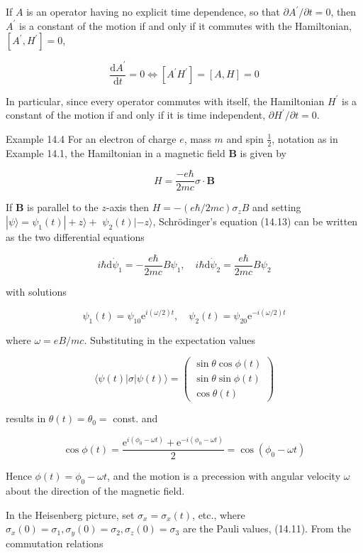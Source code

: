 \documentclass[10pt]{article}
\begin{document}
If $A$ is an operator having no explicit time dependence, so that $\partial A^{\prime} / \partial t=0$, then $A^{\prime}$ is a constant of the motion if and only if it commutes with the Hamiltonian, $\left[A^{\prime}, H^{\prime}\right]=0$,

$$
\frac{\mathrm{d} A^{\prime}}{\mathrm{d} t}=0 \Longleftrightarrow\left[A^{\prime} H^{\prime}\right]=[A, H]=0
$$

In particular, since every operator commutes with itself, the Hamiltonian $H^{\prime}$ is a constant of the motion if and only if it is time independent, $\partial H^{\prime} / \partial t=0$.

Example 14.4 For an electron of charge $e$, mass $m$ and spin $\frac{1}{2}$, notation as in Example 14.1, the Hamiltonian in a magnetic field $\mathbf{B}$ is given by

$$
H=\frac{-e \hbar}{2 m c} \sigma \cdot \mathbf{B}
$$

If $\mathbf{B}$ is parallel to the $z$-axis then $H=-(e \hbar / 2 m c) \sigma_{z} B$ and setting $|\psi\rangle=\psi_{1}(t)|+z\rangle+$ $\psi_{2}(t)|-z\rangle$, Schrödinger's equation (14.13) can be written as the two differential equations

$$
i \hbar \mathrm{d} \dot{\psi}_{1}=-\frac{e \hbar}{2 m c} B \psi_{1}, \quad i \hbar \mathrm{d} \dot{\psi}_{2}=\frac{e \hbar}{2 m c} B \psi_{2}
$$

with solutions

$$
\psi_{1}(t)=\psi_{10} \mathrm{e}^{i(\omega / 2) t}, \quad \psi_{2}(t)=\psi_{20} \mathrm{e}^{-i(\omega / 2) t}
$$

where $\omega=e B / m c$. Substituting in the expectation values

$$
\langle\psi(t)|\sigma| \psi(t)\rangle=\left(\begin{array}{c}
\sin \theta \cos \phi(t) \\
\sin \theta \sin \phi(t) \\
\cos \theta(t)
\end{array}\right)
$$

results in $\theta(t)=\theta_{0}=$ const. and

$$
\cos \phi(t)=\frac{\mathrm{e}^{i\left(\phi_{0}-\omega t\right)}+\mathrm{e}^{-i\left(\phi_{0}-\omega t\right)}}{2}=\cos \left(\phi_{0}-\omega t\right)
$$

Hence $\phi(t)=\phi_{0}-\omega t$, and the motion is a precession with angular velocity $\omega$ about the direction of the magnetic field.

In the Heisenberg picture, set $\sigma_{x}=\sigma_{x}(t)$, etc., where $\sigma_{x}(0)=\sigma_{1}, \sigma_{y}(0)=\sigma_{2}, \sigma_{z}(0)=\sigma_{3}$ are the Pauli values, (14.11). From the commutation relations
\end{document}
